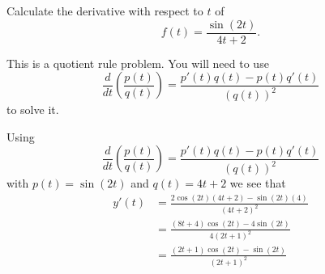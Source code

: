 \documentclass{ximera}
\author{Emma Smith Zbarsky}
\begin{document}
\begin{exercise}

Calculate the derivative with respect to $t$ of
\[f(t) = \frac{\sin(2t)}{4t+2}.\]


\begin{hint}
This is a quotient rule problem. You will need to use
\[\frac{d}{dt}\left(\frac{p(t)}{q(t)}\right) = \frac{p'(t)q(t)-p(t)q'(t)}{\left(q(t)\right)^2}\]
to solve it.
\end{hint}


\begin{hint}
Using
\[\frac{d}{dt}\left(\frac{p(t)}{q(t)}\right) = \frac{p'(t)q(t)-p(t)q'(t)}{\left(q(t)\right)^2}\]
with $p(t) = \sin(2t)$ and $q(t) = 4t+2$ we see that \begin{align*}
y'(t) &= \frac{2\cos(2t)(4t+2)-\sin(2t)(4)}{(4t+2)^2} \\
&= \frac{(8t+4)\cos(2t)-4\sin(2t)}{4(2t+1)^2} \\
&= \boxed{\frac{(2t+1)\cos(2t)-\sin(2t)}{(2t+1)^2}}
\end{align*}
\end{hint}


\begin{multipleChoice}
\end{multipleChoice}

\end{exercise}
\end{document}
